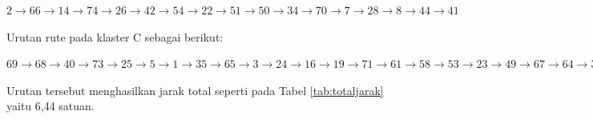 \noindent $
2 \rightarrow 66 \rightarrow 14 \rightarrow 74 \rightarrow 26 \rightarrow 42 \rightarrow 54 \rightarrow 22 \rightarrow 51 \rightarrow 50 \rightarrow 34 \rightarrow 70 \rightarrow 7 \rightarrow 28 \rightarrow 8 \rightarrow 44 \rightarrow 41
$

\noindent Urutan rute pada klaster C sebagai berikut:

\noindent $
69 \rightarrow 68 \rightarrow 40 \rightarrow 73 \rightarrow 25 \rightarrow 5 \rightarrow 1 \rightarrow 35 \rightarrow 65 \rightarrow 3 \rightarrow 24 \rightarrow 16 \rightarrow 19 \rightarrow 71 \rightarrow 61 \rightarrow 58 \rightarrow 53 \rightarrow 23 \rightarrow 49 \rightarrow 67 \rightarrow 64 \rightarrow 33 \rightarrow 4 \rightarrow 18 \rightarrow 39 \rightarrow 48 \rightarrow 20 \rightarrow 75 \rightarrow 63 \rightarrow 15 \rightarrow 31 \rightarrow 43 \rightarrow 57 \rightarrow 9 \rightarrow 6 \rightarrow 12 \rightarrow 46 \rightarrow 45 \rightarrow 52 \rightarrow 62
$

Urutan tersebut menghasilkan jarak total seperti pada Tabel \ref{tab:totaljarak} yaitu 6,44 satuan.